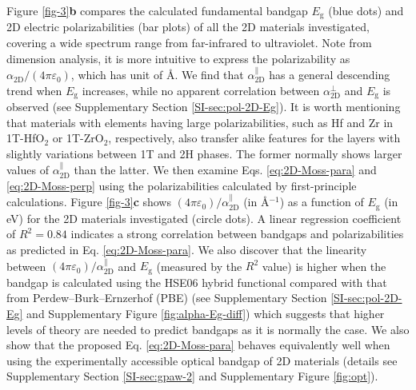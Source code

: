 \documentclass[journal=ancac3,manuscript=article,email=true,hyperref=true,keywords=false]{achemso}
\begin{document}
%
%
%
Figure \ref{fig-3}{\bf b} compares the calculated fundamental bandgap
$E_{\mathrm{g}}$ (blue dots) and 2D electric polarizabilities (bar
plots) of all the 2D materials investigated, covering a wide spectrum
range from far-infrared to ultraviolet.  Note from dimension analysis,
it is more intuitive to express the polarizability as
$\alpha_{\mathrm{2D}}/(4 \pi \varepsilon_{0})$, which has unit of
\AA. We find that $\alpha_{\mathrm{2D}}^{\parallel}$ has a general
descending trend when $E_{\mathrm{g}}$ increases, while no apparent
correlation between $\alpha_{\mathrm{2D}}^{\perp}$ and
$E_{\mathrm{g}}$ is observed (see Supplementary Section
\ref{SI-sec:pol-2D-Eg}). It is worth mentioning that materials with
elements having large polarizabilities, such as Hf and Zr in
1T-HfO$_2$ or 1T-ZrO$_2$, respectively, also transfer alike features
for the layers with slightly variations between 1T and 2H phases. The
former normally shows larger values of
$\alpha_{\mathrm{2D}}^{\parallel}$ than the latter.
%
% 
We then examine Eqs. \ref{eq:2D-Moss-para}
and \ref{eq:2D-Moss-perp} using the polarizabilities calculated by
first-principle calculations. 
Figure \ref{fig-3}{\bf c} shows
$(4 \pi \varepsilon_{0})/\alpha_{\mathrm{2D}}^{\parallel}$ (in
\AA{}$^{-1}$) as a function of $E_{\mathrm{g}}$ (in eV) for the 2D
materials investigated (circle dots).  
A linear regression coefficient of $R^{2}=0.84$ indicates a 
strong correlation between bandgaps and polarizabilities as predicted in 
Eq. \ref{eq:2D-Moss-para}. 
We also discover that
the linearity between
$(4 \pi \varepsilon_{0})/\alpha_{\mathrm{2D}}^{\parallel}$ and
$E_{\mathrm{g}}$ (measured by the $R^{2}$ value) is higher when the
bandgap is calculated using the HSE06 hybrid functional\cite{Heyd_2005} compared
with that from Perdew--Burk--Ernzerhof (PBE) %
(see Supplementary Section \ref{SI-sec:pol-2D-Eg} and
Supplementary Figure \ref{fig:alpha-Eg-diff}) which suggests that higher levels 
of theory are needed to predict bandgaps as it is normally the case.   
We also show
that the proposed Eq. \ref{eq:2D-Moss-para}
behaves equivalently well when using the
experimentally accessible optical bandgap of 2D materials (details see
Supplementary Section \ref{SI-sec:gpaw-2} and Supplementary Figure
\ref{fig:opt}). 
\end{document}
